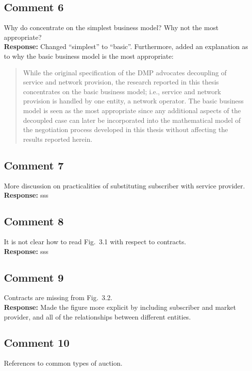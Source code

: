 \documentclass[10pt,a4paper,notitlepage]{article}
\numberwithin{equation}{section}
\begin{document}
\subsection{Comment 6}
Why do concentrate on the simplest business model? Why not the most appropriate?\\[-2ex]

\textbf{Response:}
Changed ``simplest'' to ``basic''. Furthermore, added an explanation as to why the basic business model is the most appropriate:
\begin{quote}
While the original specification of the DMP advocates decoupling of service and network provision, the research reported in this thesis concentrates on the basic business model; i.e., service and network provision is handled by one entity, a network operator. The basic business model is seen as the most appropriate since any additional aspects of the decoupled case can later be incorporated into the mathematical model of the negotiation process developed in this thesis without affecting the results reported herein.
\end{quote}

\subsection{Comment 7}
More discussion on practicalities of substituting subscriber with service provider.\\[-2ex]

\textbf{Response:}
sss

\subsection{Comment 8}
It is not clear how to read Fig.~3.1 with respect to contracts.\\[-2ex]

\textbf{Response:}
sss

\subsection{Comment 9}
Contracts are missing from Fig.~3.2.\\[-2ex]

\textbf{Response:}
Made the figure more explicit by including subscriber and market provider, and all of the relationships between different entities.

\subsection{Comment 10}
References to common types of auction.
\end{document}
